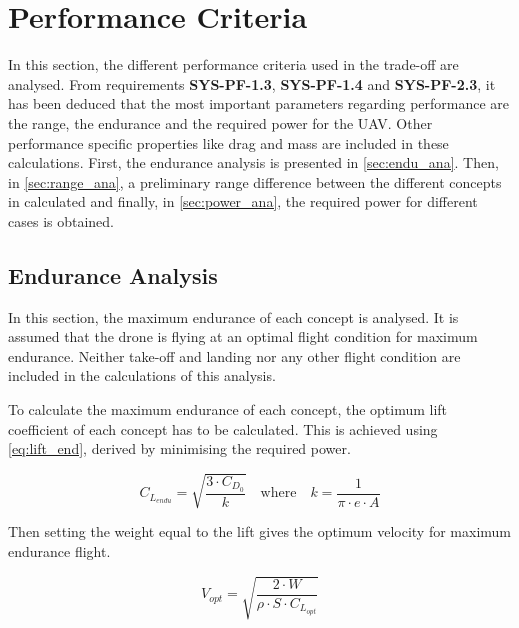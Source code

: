 
\section{Performance Criteria}
\label{sec:perf}

In this section, the different performance criteria used in the trade-off are analysed. From requirements \textbf{SYS-PF-1.3}, \textbf{SYS-PF-1.4} and \textbf{SYS-PF-2.3}, it has been deduced that the most important parameters regarding performance are the range, the endurance and the required power for the UAV. Other performance specific properties like drag and mass are included in these calculations.  
First, the endurance analysis is presented in \autoref{sec:endu_ana}. Then, in \autoref{sec:range_ana}, a preliminary range difference between the different concepts in calculated and finally, in \autoref{sec:power_ana}, the required power for different cases is obtained.

\subsection{Endurance Analysis}
\label{sec:endu_ana}

In this section, the maximum endurance of each concept is analysed. It is assumed that the drone is flying at an optimal flight condition for maximum endurance. Neither take-off and landing nor any other flight condition are included in the calculations of this analysis.

To calculate the maximum endurance of each concept, the optimum lift coefficient of each concept has to be calculated. This is achieved using \autoref{eq:lift_end}, derived by minimising the required power.

\begin{equation}
    C_{L_{endu}} = \sqrt{\frac{3\cdot C_{D_0}}{k}} \quad \mathrm{where} \quad k=\frac{1}{\pi \cdot e\cdot A}
    \label{eq:lift_end}
\end{equation}

Then setting the weight equal to the lift gives the optimum velocity for maximum endurance flight.

\begin{equation}
    V_{opt} = \sqrt{\frac{2\cdot W}{\rho\cdot S\cdot C_{L_{opt}}}}
    \label{eq:vopt}
\end{equation}

